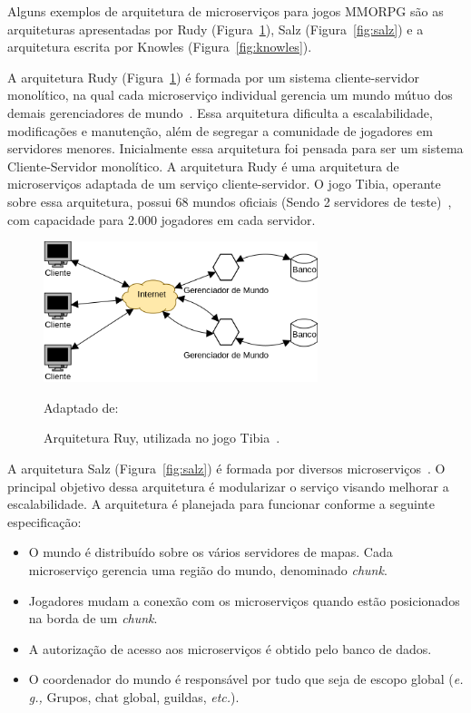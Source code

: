 Alguns exemplos de arquitetura de microserviços para jogos \ac{MMORPG} são as arquiteturas apresentadas por Rudy (Figura~\ref{fig:rudy}), Salz (Figura~\ref{fig:salz}) e a arquitetura escrita por Knowles (Figura~\ref{fig:knowles}).

A arquitetura Rudy (Figura~\ref{fig:rudy}) é formada por um sistema cliente-servidor monolítico, na qual cada microserviço individual gerencia um mundo mútuo dos demais gerenciadores de mundo~\cite{matthiasrudy2011}.
%
Essa arquitetura dificulta a escalabilidade, modificações e manutenção\cite{8169955}, além de segregar a comunidade de jogadores em servidores menores\cite{matthiasrudy2011}.
%
Inicialmente essa arquitetura foi pensada para ser um sistema Cliente-Servidor monolítico.
%
A arquitetura Rudy é uma arquitetura de microserviços adaptada de um serviço cliente-servidor\cite{matthiasrudy2011}.
%
O jogo Tibia, operante sobre essa arquitetura, possui 68 mundos oficiais (Sendo 2 servidores de teste)~\cite{matthiasrudy2011}, com capacidade para 2.000 jogadores em cada servidor.

\begin{figure}[htb!]
  \caption{Arquitetura Ruy, utilizada no jogo Tibia~\cite{matthiasrudy2011}.}
  \label{fig:rudy}
  \includegraphics[width=8cm]{arquiteturas/rudy.png}
  \centering

  Adaptado de:~\cite{matthiasrudy2011}
\end{figure}

A arquitetura Salz (Figura~\ref{fig:salz}) é formada por diversos microserviços~\cite{albion_online_unite}.
%
O principal objetivo dessa arquitetura é modularizar o serviço visando melhorar a escalabilidade.
%
A arquitetura é planejada para funcionar conforme a seguinte especificação\cite{albion_online_unite}:

\begin{itemize}
  \item O mundo é distribuído sobre os vários servidores de mapas. Cada microserviço gerencia uma região do mundo, denominado \textit{chunk}.
  \item Jogadores mudam a conexão com os microserviços quando estão posicionados na borda de um \textit{chunk}.
  \item A autorização de acesso aos microserviços é obtido pelo banco de dados.
  \item O coordenador do mundo é responsável por tudo que seja de escopo global (\textit{e. g.,} Grupos, chat global, guildas, \textit{etc.}).
\end{itemize}

